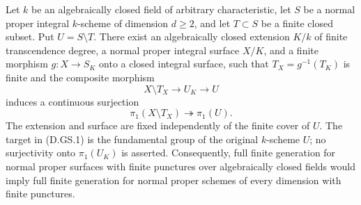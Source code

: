 \begin{theorem}
\label{D:generic-surface-finite-punctures}
Let $k$ be an algebraically closed field of arbitrary characteristic,
let $S$ be a normal proper integral $k$-scheme of dimension $d\ge2$,
and let $T\subset S$ be a finite closed subset. Put $U=S\setminus T$.
There exist an algebraically closed extension $K/k$ of finite
transcendence degree, a normal proper integral surface $X/K$, and a
finite morphism $g:X\to S_K$ onto a closed integral surface, such that
$T_X=g^{-1}(T_K)$ is finite and the composite morphism
\[
       X\setminus T_X\longrightarrow U_K\longrightarrow U
\]
induces a continuous surjection
\[
       \pi_1(X\setminus T_X)\twoheadrightarrow\pi_1(U).
       \tag{D.GS.1}
\]
The extension and surface are fixed independently of the finite cover
of $U$. The target in (D.GS.1) is the fundamental group of the original
$k$-scheme $U$; no surjectivity onto $\pi_1(U_K)$ is asserted.
Consequently, full finite generation for normal proper surfaces with
finite punctures over algebraically closed fields would imply full
finite generation for normal proper schemes of every dimension with
finite punctures.
\end{theorem}

